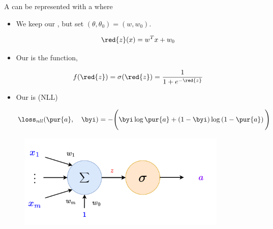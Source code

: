         \begin{concept}
            A  can be represented with a  where
            
            \begin{itemize}
                \item We keep our , but set $(\theta, \theta_0) = (w, w_0)$.
                
                \begin{equation*}
                    \red{z}(x) = w^Tx+w_0
                \end{equation*}
                
                \item Our  is the  function, 
                
                \begin{equation*}
                    f(\red{z}) = \sigma(\red{z}) = \frac{1}{1+e^{-\red{z}}}
                \end{equation*}
                
                \item Our  is  (NLL)
                
                \begin{equation*}
                    \loss_{nll}
                    (\pur{a} ,\quad \byi)
                    =
                    -
                    \Bigg(
                        \byi \log{\pur{a}}
                        +
                        \left( 1 - \byi \right)
                        \log
                        \left( 1-\pur{a} \right) 
                    \Bigg)
                \end{equation*}
            
            \end{itemize}
        \end{concept}
        
        \begin{figure}[H]
            \centering
            \includegraphics[width=100mm,scale=0.4]{images/nn_images/llc_unit.png}
        \end{figure}
        
